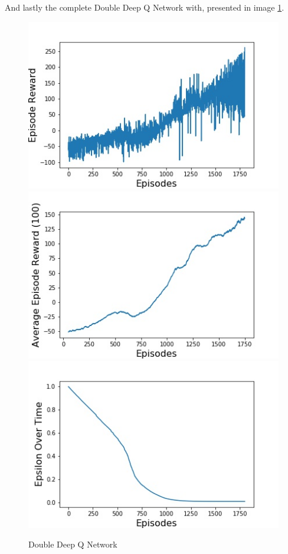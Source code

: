 \documentclass{article}
\begin{document}
And lastly the complete Double Deep Q Network with, presented in image \ref{fig:fig4}.

\begin{figure}[H]
\centering
\includegraphics[scale=0.25]{rewardOverEpisodesDouble-Target-DQN-NormalMemory}
\includegraphics[scale=0.25]{movingAverageDouble-Target-DQN-NormalMemory}
\includegraphics[scale=0.25]{epsilonDouble-Target-DQN-NormalMemory}
\caption{Double Deep Q Network}
\label{fig:fig4}
\end{figure}
\end{document}
